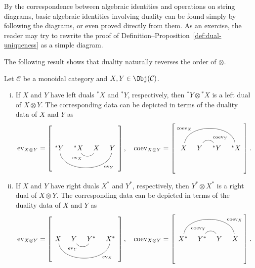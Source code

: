 By the correspondence between algebraic identities and operations on string
diagrams, basic algebraic identities involving duality can be found simply
by following the diagrams, or even proved directly from them. As an
exercise, the reader may try to rewrite the proof of
Definition--Proposition~\ref{def:dual-uniqueness} as a simple diagram.

The following result shows that duality naturally reverses the order of
$\otimes$.

\begin{proposition}
	Let $\mathcal{C}$ be a monoidal category and
	$X,Y\in\Obj(\mathcal{C})$.
	\begin{enumerate}[(i)]
		\item If $X$ and $Y$ have left duals ${}^*X$ and ${}^*Y$,
		respectively, then ${}^*Y\otimes{}^*X$ is a left dual of $X\otimes Y$.
		The corresponding data can be depicted in terms of the duality data of
		$X$ and $Y$ as
		\begin{equation*}
			\mathrm{ev}_{X \otimes Y} = \left[ \begin{tikzcd}[column sep=tiny, ampersand replacement=\&]
				{}^* Y \arrow[dash, rrr, bend right=80, "{\mathrm{ev}_Y}"' near end] \& {}^* X \arrow[dash, r, bend right=60, "{\mathrm{ev}_X}"' near start] \& X \& Y
			\end{tikzcd}\right], \quad
			\mathrm{coev}_{X \otimes Y} = \left[ \begin{tikzcd}[column sep=tiny, ampersand replacement=\&]
				X \arrow[dash, rrr, bend left=80, "{\mathrm{coev}_X}" near start] \& Y \arrow[dash, r, bend left=60, "{\mathrm{coev}_Y}" near end] \& {}^* Y \& {}^* X
			\end{tikzcd}\right].
		\end{equation*}
		\item If $X$ and $Y$ have right duals $X^*$ and $Y^*$,
		respectively, then $Y^*\otimes X^*$ is a right dual of $X\otimes Y$.
		The corresponding data can be depicted in terms of the duality data of
		$X$ and $Y$ as
		\begin{equation*}
			\mathrm{ev}_{X \otimes Y} = \left[ \begin{tikzcd}[column sep=tiny, ampersand replacement=\&]
				X \arrow[dash, rrr, bend right=80, "{\mathrm{ev}_X}"' near end] \& Y \arrow[dash, r, bend right=60, "{\mathrm{ev}_Y}"' near start] \& Y^* \& X^*
			\end{tikzcd}\right], \quad
			\mathrm{coev}_{X \otimes Y} = \left[ \begin{tikzcd}[column sep=tiny, ampersand replacement=\&]
				X^* \arrow[dash, rrr, bend left=80, "{\mathrm{coev}_X}" near end] \& Y^* \arrow[dash, r, bend left=60, "{\mathrm{coev}_Y}" near start] \& Y \& X
			\end{tikzcd}\right].
		\end{equation*}
	\end{enumerate}
\end{proposition}
